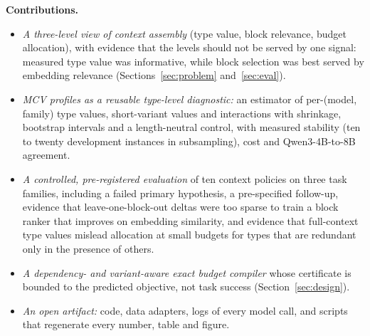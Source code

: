 \textbf{Contributions.}
\begin{itemize}
\item \emph{A three-level view of context assembly} (type value, block relevance, budget allocation), with evidence that
the levels should not be served by one signal: measured type value was informative, while block selection was best served
by embedding relevance (Sections~\ref{sec:problem} and~\ref{sec:eval}).
\item \emph{MCV profiles as a reusable type-level diagnostic:} an estimator of per-(model, family) type values,
short-variant values and interactions with shrinkage, bootstrap intervals and a length-neutral control, with measured
stability (ten to twenty development instances in subsampling), cost and Qwen3-4B-to-8B agreement.
\item \emph{A controlled, pre-registered evaluation} of ten context policies on three task families, including a failed
primary hypothesis, a pre-specified follow-up, evidence that leave-one-block-out deltas were too sparse to train a
block ranker that improves on embedding similarity, and evidence that full-context type values mislead allocation at small
budgets for types that are redundant only in the presence of others.
\item \emph{A dependency- and variant-aware exact budget compiler} whose certificate is bounded to the predicted
objective, not task success (Section~\ref{sec:design}).
\item \emph{An open artifact:} code, data adapters, logs of every model call, and scripts that regenerate every number,
table and figure.
\end{itemize}
